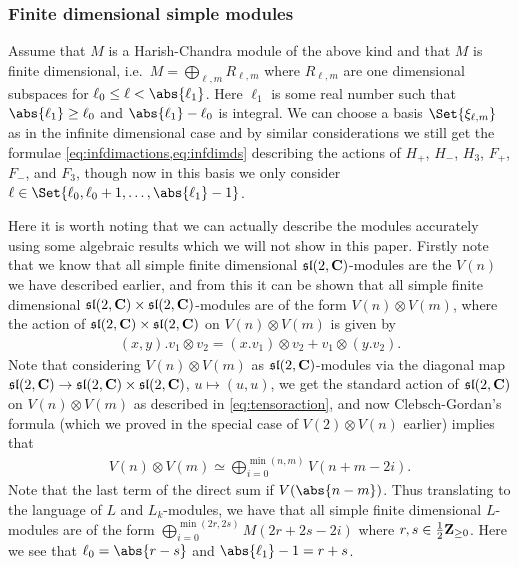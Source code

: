 \subsubsection{Finite dimensional simple modules}

Assume that $M$ is a Harish-Chandra module of the above kind and that $M$ is finite dimensional, i.e.\ $M=\bigoplus_{\ell,m} R_{\ell,m}$ where $R_{\ell,m}$ are one dimensional subspaces for $\ell_0\leq \ell < \abs{\ell_1}$. Here $\ell_1$ is some real number such that $\abs{\ell_1}\geq \ell_0$ and $\abs{\ell_1}-\ell_0$ is integral. We can choose a basis $\Set{\xi_{\ell,m}}$ as in the infinite dimensional case and by similar considerations we still get the formulae \cref{eq:infdimactions,eq:infdimds} describing the actions of $H_+$, $H_-$, $H_3$, $F_+$, $F_-$, and $F_3$, though now in this basis we only consider $\ell\in\Set{\ell_0,\ell_0+1,\dotsc,\abs{\ell_1}-1}$. 

Here it is worth noting that we can actually describe the modules accurately using some algebraic results which we will not show in this paper. Firstly note that we know that all simple finite dimensional $\mathfrak{sl}(2,\mathbf{C})$-modules are the $V(n)$ we have described earlier, and from this it can be shown that all simple finite dimensional $\mathfrak{sl}(2,\mathbf{C})\times \mathfrak{sl}(2,\mathbf{C})$-modules are of the form $V(n)\otimes V(m)$, where the action of $\mathfrak{sl}(2,\mathbf{C})\times \mathfrak{sl}(2,\mathbf{C})$ on $V(n)\otimes V(m)$ is given by
\begin{align*}
  (x,y).v_1\otimes v_2 = (x.v_1)\otimes v_2 + v_1\otimes (y.v_2).
\end{align*}
Note that considering $V(n)\otimes V(m)$ as $\mathfrak{sl}(2,\mathbf{C})$-modules via the diagonal map $\mathfrak{sl}(2,\mathbf{C})\to\mathfrak{sl}(2,\mathbf{C})\times \mathfrak{sl}(2,\mathbf{C})$, $u\mapsto (u,u)$, we get the standard action of $\mathfrak{sl}(2,\mathbf{C})$ on $V(n)\otimes V(m)$ as described in \cref{eq:tensoraction}, and now Clebsch-Gordan's formula (which we proved in the special case of $V(2)\otimes V(n)$ earlier) implies that
\begin{align*}
  V(n)\otimes V(m) \simeq \bigoplus_{i=0}^{\min(n,m)} V(n+m-2i).
\end{align*}
Note that the last term of the direct sum if $V(\abs{n-m})$. Thus translating to the language of $L$ and $L_k$-modules, we have that all simple finite dimensional $L$-modules are of the form $\bigoplus_{i=0}^{\min(2r,2s)} M(2r+2s-2i)$ where $r,s\in \tfrac{1}{2}\mathbf{Z}_{\geq0}$. Here we see that $\ell_0 = \abs{r-s}$ and $\abs{\ell_1}-1=r+s$. 

